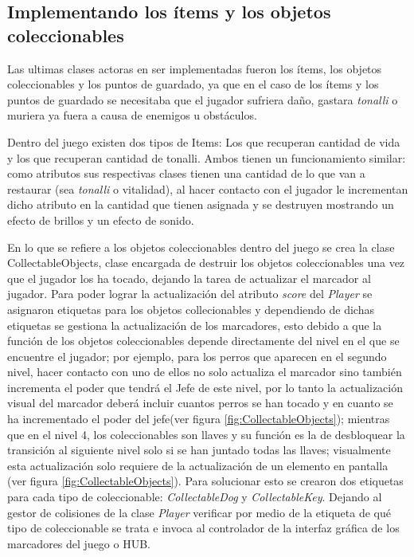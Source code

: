\subsection{Implementando los ítems y los objetos coleccionables}
Las ultimas clases actoras en ser implementadas fueron los ítems, los objetos 
coleccionables y los puntos de guardado, ya que en el caso de los ítems y los 
puntos de guardado se necesitaba que el jugador sufriera daño, gastara 
\textit{tonalli} o muriera ya fuera a causa de enemigos u obstáculos. 
\\
\par
Dentro del juego existen dos tipos de Items: Los que recuperan cantidad de vida y 
los que recuperan cantidad de tonalli. Ambos tienen un funcionamiento similar: como 
atributos sus respectivas clases tienen una cantidad de lo que van a restaurar 
(sea \textit{tonalli} o vitalidad), al hacer contacto con el jugador le incrementan 
dicho atributo en la cantidad que tienen asignada y se destruyen mostrando un 
efecto de brillos y un efecto de sonido. 
\\
\par
En lo que se refiere a los objetos coleccionables dentro del juego se crea la 
clase CollectableObjects, clase encargada de destruir los objetos coleccionables 
una vez que el jugador los ha tocado, dejando la tarea de actualizar el marcador 
al jugador. Para poder lograr la actualización del atributo \textit{score} del 
\textit{Player} se asignaron etiquetas para los objetos collecionables y dependiendo 
de dichas etiquetas se gestiona la actualización de los marcadores, esto debido a que 
la función de los objetos coleccionables depende directamente del nivel en el que 
se encuentre el jugador; por ejemplo, para los perros que aparecen en el segundo 
nivel, hacer contacto con uno de ellos no solo actualiza el marcador sino también 
incrementa el poder que tendrá el Jefe de este nivel, por lo tanto 
la actualización visual del marcador deberá incluir cuantos perros se han tocado 
y en cuanto se ha incrementado el poder del jefe(ver figura 
\ref{fig:CollectableObjects}); mientras que en el nivel 4, los coleccionables 
son llaves y su función es la de desbloquear la transición al siguiente nivel 
solo si se han juntado todas las llaves; visualmente esta actualización solo 
requiere de la actualización de un elemento en pantalla (ver figura \ref{fig:CollectableObjects}). Para solucionar esto se crearon dos etiquetas para cada tipo de coleccionable: \textit{CollectableDog} y \textit{CollectableKey}.  Dejando al gestor de colisiones de la clase \textit{Player} verificar por medio de la etiqueta de qué tipo de coleccionable se trata e invoca al controlador de la interfaz gráfica de los marcadores del juego o HUB.
			
